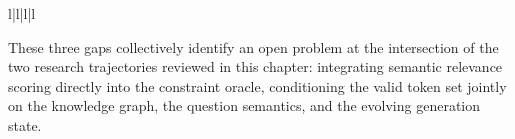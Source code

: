 \begin{table}[H]
{\begin{gridtabular}{l|l|l|l}
        \end{gridtabular}
    }
\end{table}

These three gaps collectively identify an open problem at the intersection of the two research trajectories reviewed in this chapter: integrating semantic relevance scoring directly into the constraint oracle, conditioning the valid token set jointly on the knowledge graph, the question semantics, and the evolving generation state.
